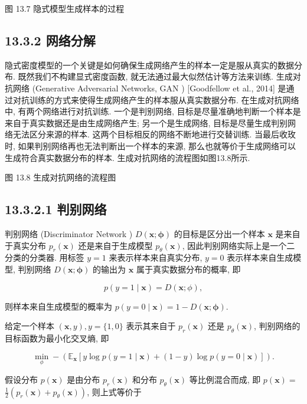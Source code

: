 \documentclass[10pt]{article}
\begin{document}
图 13.7 隐式模型生成样本的过程

\subsection*{13.3.2 网络分解}
隐式密度模型的一个关键是如何确保生成网络产生的样本一定是服从真实的数据分布. 既然我们不构建显式密度函数, 就无法通过最大似然估计等方法来训练. 生成对抗网络 (Generative Adversarial Networks, GAN ) [Goodfellow et al., 2014] 是通过对抗训练的方式来使得生成网络产生的样本服从真实数据分布. 在生成对抗网络中, 有两个网络进行对抗训练. 一个是判别网络, 目标是尽量准确地判断一个样本是来自于真实数据还是由生成网络产生; 另一个是生成网络, 目标是尽量生成判别网络无法区分来源的样本. 这两个目标相反的网络不断地进行交替训练. 当最后收玫时, 如果判别网络再也无法判断出一个样本的来源, 那么也就等价于生成网络可以生成符合真实数据分布的样本. 生成对抗网络的流程图如图13.8所示.



图 13.8 生成对抗网络的流程图

\subsection*{13.3.2.1 判别网络}
判别网络 (Discriminator Network ) $D(\boldsymbol{x} ; \boldsymbol{\phi})$ 的目标是区分出一个样本 $\boldsymbol{x}$ 是来自于真实分布 $p_{r}(\boldsymbol{x})$ 还是来自于生成模型 $p_{\theta}(\boldsymbol{x})$, 因此判别网络实际上是一个二分类的分类器. 用标签 $y=1$ 来表示样本来自真实分布, $y=0$ 表示样本来自生成模型, 判别网络 $D(\boldsymbol{x} ; \boldsymbol{\phi})$ 的输出为 $\boldsymbol{x}$ 属于真实数据分布的概率, 即


\begin{equation*}
p(y=1 \mid \boldsymbol{x})=D(\boldsymbol{x} ; \phi), \tag{13.29}
\end{equation*}


则样本来自生成模型的概率为 $p(y=0 \mid \boldsymbol{x})=1-D(\boldsymbol{x} ; \boldsymbol{\phi})$.

给定一个样本 $(\boldsymbol{x}, y), y=\{1,0\}$ 表示其来自于 $p_{r}(\boldsymbol{x})$ 还是 $p_{\theta}(\boldsymbol{x})$, 判别网络的目标函数为最小化交叉熵, 即


\begin{equation*}
\min _{\phi}-\left(\mathbb{E}_{\boldsymbol{x}}[y \log p(y=1 \mid \boldsymbol{x})+(1-y) \log p(y=0 \mid \boldsymbol{x})]\right) . \tag{13.30}
\end{equation*}


假设分布 $p(\boldsymbol{x})$ 是由分布 $p_{r}(\boldsymbol{x})$ 和分布 $p_{\theta}(\boldsymbol{x})$ 等比例混合而成, 即 $p(\boldsymbol{x})=$ $\frac{1}{2}\left(p_{r}(\boldsymbol{x})+p_{\theta}(\boldsymbol{x})\right)$, 则上式等价于
\end{document}

